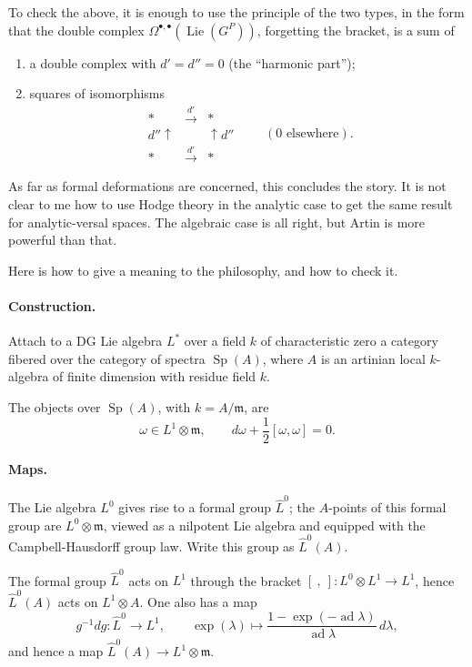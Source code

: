 \documentclass[11pt]{article}
\newcommand{\Lie}{\operatorname{Lie}}
\newcommand{\Sp}{\operatorname{Sp}}
\newcommand{\ad}{\operatorname{ad}}
\newcommand{\expop}{\operatorname{exp}}
\begin{document}
To check the above, it is enough to use the principle of the two types, in the form that the double complex $\Omega^{\bullet,\bullet}(\Lie(G^P))$, forgetting the bracket, is a sum of
\begin{enumerate}[label=\alph*)]
\item a double complex with $d'=d''=0$ (the ``harmonic part'');
\item squares of isomorphisms
\[
\begin{array}{ccc}
 * & \xrightarrow{\ d'\ } & * \\
 {\scriptstyle d''}\uparrow && \uparrow{\scriptstyle d''} \\
 * & \xrightarrow{\ d'\ } & *
\end{array}
\qquad (0\text{ elsewhere}).
\]
\end{enumerate}

As far as formal deformations are concerned, this concludes the story. It is not clear to me how to use Hodge theory in the analytic case to get the same result for analytic-versal spaces. The algebraic case is all right, but Artin is more powerful than that.

Here is how to give a meaning to the philosophy, and how to check it.

\paragraph{Construction.}
Attach to a DG Lie algebra $L^*$ over a field $k$ of characteristic zero a category fibered over the category of spectra $\Sp(A)$, where $A$ is an artinian local $k$-algebra of finite dimension with residue field $k$.

The objects over $\Sp(A)$, with $k=A/\mathfrak m$, are
\[
  \omega\in L^1\otimes\mathfrak m,
  \qquad
  d\omega+\frac12[\omega,\omega]=0.
\]

\paragraph{Maps.}
The Lie algebra $L^0$ gives rise to a formal group $\widehat L^0$; the $A$-points of this formal group are $L^0\otimes\mathfrak m$, viewed as a nilpotent Lie algebra and equipped with the Campbell-Hausdorff group law. Write this group as $\widehat L^0(A)$.

The formal group $\widehat L^0$ acts on $L^1$ through the bracket $[\ ,\ ]:L^0\otimes L^1\to L^1$, hence $\widehat L^0(A)$ acts on $L^1\otimes A$. One also has a map
\[
  g^{-1}dg:\widehat L^0\longrightarrow L^1,
  \qquad
  \expop(\lambda)\longmapsto
  \frac{1-\expop(-\ad\lambda)}{\ad\lambda}\,d\lambda,
\]
and hence a map $\widehat L^0(A)\to L^1\otimes\mathfrak m$.
\end{document}
